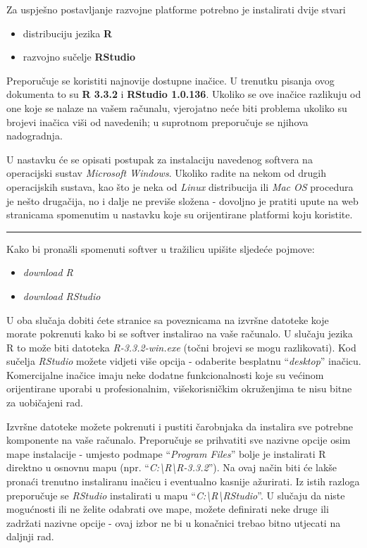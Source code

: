 \documentclass[]{book}
\providecommand{\tightlist}{%
  \setlength{\itemsep}{0pt}\setlength{\parskip}{0pt}}
\theoremstyle{definition}
\theoremstyle{definition}
\theoremstyle{definition}
\theoremstyle{remark}
\begin{document}
Za uspješno postavljanje razvojne platforme potrebno je instalirati
dvije stvari

\begin{itemize}
\tightlist
\item
  distribuciju jezika \textbf{R}
\item
  razvojno sučelje \textbf{RStudio}
\end{itemize}

Preporučuje se koristiti najnovije dostupne inačice. U trenutku pisanja
ovog dokumenta to su \textbf{R 3.3.2} i \textbf{RStudio 1.0.136}.
Ukoliko se ove inačice razlikuju od one koje se nalaze na vašem
računalu, vjerojatno neće biti problema ukoliko su brojevi inačica viši
od navedenih; u suprotnom preporučuje se njihova nadogradnja.

U nastavku će se opisati postupak za instalaciju navedenog softvera na
operacijski sustav \emph{Microsoft Windows}. Ukoliko radite na nekom od
drugih operacijskih sustava, kao što je neka od \emph{Linux}
distribucija ili \emph{Mac OS} procedura je nešto drugačija, no i dalje
ne previše složena - dovoljno je pratiti upute na web stranicama
spomenutim u nastavku koje su orijentirane platformi koju koristite.

\begin{center}\rule{0.5\linewidth}{\linethickness}\end{center}

Kako bi pronašli spomenuti softver u tražilicu upišite sljedeće pojmove:

\begin{itemize}
\tightlist
\item
  \emph{download R}
\item
  \emph{download RStudio}
\end{itemize}

U oba slučaja dobiti ćete stranice sa poveznicama na izvršne datoteke
koje morate pokrenuti kako bi se softver instalirao na vaše računalo. U
slučaju jezika R to može biti datoteka \emph{R-3.3.2-win.exe} (točni
brojevi se mogu razlikovati). Kod sučelja \emph{RStudio} možete vidjeti
više opcija - odaberite besplatnu ``\emph{desktop}'' inačicu.
Komercijalne inačice imaju neke dodatne funkcionalnosti koje su većinom
orijentirane uporabi u profesionalnim, višekorisničkim okruženjima te
nisu bitne za uobičajeni rad.

Izvršne datoteke možete pokrenuti i pustiti čarobnjaka da instalira sve
potrebne komponente na vaše računalo. Preporučuje se prihvatiti sve
nazivne opcije osim mape instalacije - umjesto podmape ``\emph{Program
Files}'' bolje je instalirati R direktno u osnovnu mapu (npr.
``\emph{C:\textbackslash{}R\textbackslash{}R-3.3.2}''). Na ovaj način
biti će lakše pronaći trenutno instaliranu inačicu i eventualno kasnije
ažurirati. Iz istih razloga preporučuje se \emph{RStudio} instalirati u
mapu ``\emph{C:\textbackslash{}R\textbackslash{}RStudio}''. U slučaju da
niste mogućnosti ili ne želite odabrati ove mape, možete definirati neke
druge ili zadržati nazivne opcije - ovaj izbor ne bi u konačnici trebao
bitno utjecati na daljnji rad.
\end{document}
